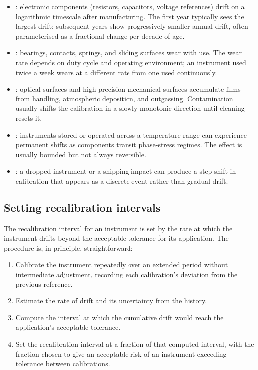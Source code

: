 \begin{itemize}[leftmargin=*]
  \item {}: electronic components (resistors,
    capacitors, voltage references) drift on a logarithmic timescale
    after manufacturing. The first year typically sees the largest
    drift; subsequent years show progressively smaller annual
    drift, often parameterised as a fractional change per
    decade-of-age.
  \item {}: bearings, contacts, springs, and
    sliding surfaces wear with use. The wear rate depends on duty
    cycle and operating environment; an instrument used twice a
    week wears at a different rate from one used continuously.
  \item {}: optical surfaces and
    high-precision mechanical surfaces accumulate films from
    handling, atmospheric deposition, and outgassing.
    Contamination usually shifts the calibration in a slowly
    monotonic direction until cleaning resets it.
  \item {}: instruments stored or operated
    across a temperature range can experience permanent shifts as
    components transit phase-stress regimes. The effect is usually
    bounded but not always reversible.
  \item {}: a dropped instrument or a
    shipping impact can produce a step shift in calibration that
    appears as a discrete event rather than gradual drift.
\end{itemize}

\subsection{Setting recalibration intervals}

The recalibration interval for an instrument is set by the rate at
which the instrument drifts beyond the acceptable tolerance for its
application. The procedure is, in principle, straightforward:

\begin{enumerate}[leftmargin=*]
  \item Calibrate the instrument repeatedly over an extended period
    without intermediate adjustment, recording each calibration's
    deviation from the previous reference.
  \item Estimate the rate of drift and its uncertainty from the
    history.
  \item Compute the interval at which the cumulative drift would
    reach the application's acceptable tolerance.
  \item Set the recalibration interval at a fraction of that
    computed interval, with the fraction chosen to give an
    acceptable risk of an instrument exceeding tolerance between
    calibrations.
\end{enumerate}

